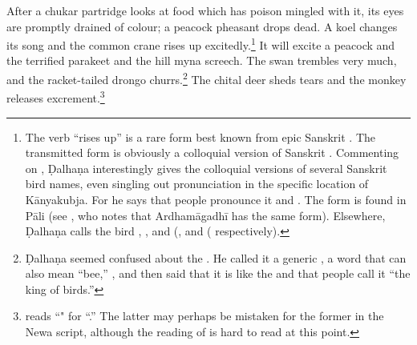 \begin{translation}

After a chukar partridge %
looks at food which has poison mingled with it, its eyes are promptly drained of
colour; a peacock pheasant %
drops dead.  A koel %
changes its song and the common crane %
rises up excitedly.\footnote{The verb  “rises up” is a rare form
best known from epic Sanskrit \citep[see][212, \S 7.6.1]{ober-2003}.   The
transmitted form  is obviously a colloquial version of Sanskrit
.  Commenting on , Ḍalhaṇa interestingly gives the
colloquial versions of several Sanskrit bird names, even singling out
pronunciation in the specific location of Kānyakubja.  For  he says
that people pronounce it  and .  The form 
is found in Pāli (see \cite[731]{cone-dict}, who notes that Ardhamāgadhī has the
same form). Elsewhere, Ḍalhaṇa calls the bird ,  , and 
(,  and
( respectively).}  It will excite a peacock 
and the terrified parakeet %
and the hill myna %
screech. The swan %
trembles very much, and the racket-tailed drongo %
churrs.\footnote{Ḍalhaṇa seemed confused about the .  He called it a generic , a word that can also mean 
“bee,” \citep[62]{dave}, and then said that it is like the
 \citep[for a nice explanation of this name,
see][62--63]{dave} and that people call it “the king of birds.”} The chital deer
sheds tears and the
monkey releases excrement.\footnote{ reads 
“" for
“.”  The latter may perhaps be mistaken for the former in
the Newa script, although the reading of  is hard to 
read at this point.}


\end{translation}
